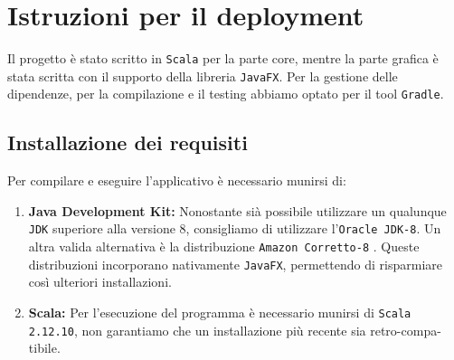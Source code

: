 \section{Istruzioni per il deployment}
	Il progetto è stato scritto in \texttt{Scala} per la parte core, mentre la parte grafica è stata scritta con il supporto della libreria \texttt{JavaFX}.
	Per la gestione delle dipendenze, per la compilazione e il testing abbiamo optato per il tool \texttt{Gradle}.

	\subsection{Installazione dei requisiti}
	 Per compilare e eseguire l'applicativo è necessario munirsi di:
	 \begin{enumerate}
	 	\item \textbf{Java Development Kit:}
	 		Nonostante sià possibile utilizzare un qualunque \texttt{JDK} superiore alla versione 8, consigliamo di utilizzare l'\texttt{Oracle JDK-8}.
	 		Un altra valida alternativa è la distribuzione \texttt{Amazon Corretto-8} \cite{AmazonCorrettoSite}.
	 		Queste distribuzioni incorporano nativamente \texttt{JavaFX}, permettendo di risparmiare così ulteriori installazioni.
	 		
	 	\item \textbf{Scala: }
	 		Per l'esecuzione del programma è necessario munirsi di \texttt{Scala 2.12.10}, non garantiamo che un installazione più recente sia retro-compa-tibile.
	 	 
	 \end{enumerate}
 		
